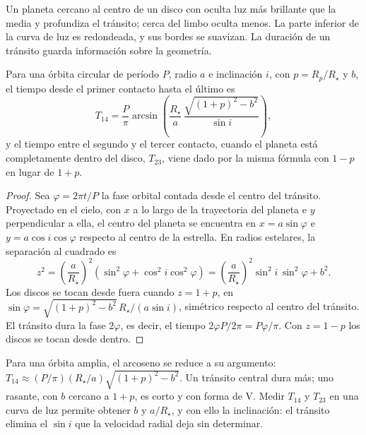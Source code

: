 Un planeta cercano al centro de un disco con  oculta luz más brillante
que la media y profundiza el tránsito; cerca del limbo oculta menos. La
parte inferior de la curva de luz es redondeada, y sus bordes se suavizan. La duración
de un tránsito guarda información sobre la geometría.

\begin{theorem}\label{thm:b3:exoplanets:duration}
Para una órbita circular de período $P$, radio $a$ e inclinación $i$, con
$p = R_p/R_\star$ y  $b$, el tiempo desde el primer
contacto hasta el último es
\[
T_{14} = \frac{P}{\pi}\arcsin\!\left(\frac{R_\star}{a}\,
          \frac{\sqrt{(1 + p)^2 - b^2}}{\sin i}\right),
\]
y el tiempo entre el segundo y el tercer contacto, cuando el planeta está
completamente dentro del disco, $T_{23}$, viene dado por la misma fórmula con
$1 - p$ en lugar de $1 + p$.
\end{theorem}

\begin{proof}
Sea $\varphi = 2\pi t/P$ la fase orbital contada desde el centro del tránsito.
Proyectado en el cielo, con $x$ a lo largo de la trayectoria del planeta e $y$ perpendicular a ella,
el centro del planeta se encuentra en $x = a\sin\varphi$ e $y = a\cos i\cos\varphi$
respecto al centro de la estrella. En radios estelares, la separación al cuadrado es
\[
z^2 = \left(\frac{a}{R_\star}\right)^2(\sin^2\varphi + \cos^2 i\cos^2\varphi)
    = \left(\frac{a}{R_\star}\right)^2\sin^2 i\,\sin^2\varphi + b^2 .
\]
Los discos se tocan desde fuera cuando $z = 1 + p$, en
$\sin\varphi = \sqrt{(1 + p)^2 - b^2}\,R_\star/(a\sin i)$, simétrico
respecto al centro del tránsito. El tránsito dura la fase $2\varphi$, es decir, el
tiempo $2\varphi P/2\pi = P\varphi/\pi$. Con $z = 1 - p$ los discos se tocan
desde dentro.
\end{proof}

Para una órbita amplia, el arcoseno se reduce a su argumento: $T_{14} \approx (P/\pi)
(R_\star/a)\sqrt{(1 + p)^2 - b^2}$. Un tránsito central dura más; uno
rasante, con $b$ cercano a $1 + p$, es corto y con forma de V. Medir
$T_{14}$ y $T_{23}$ en una curva de luz permite obtener $b$ y $a/R_\star$, y con ello la
inclinación: el tránsito elimina el $\sin i$ que la velocidad
radial deja sin determinar.

